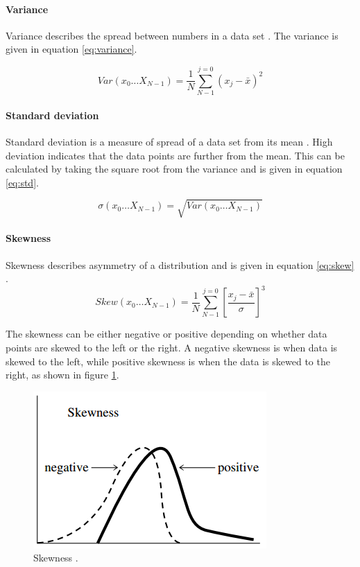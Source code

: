 \documentclass[USenglish]{ifimaster}  %
\begin{document}
	
\paragraph{Variance}
Variance describes the spread between numbers in a data set \cite{Press:2007:NRE:1403886}. The variance is given in equation \ref{eq:variance}.
	
\begin{equation}
Var(x_0\dotsc X_{N-1})  = \frac{1}{N}\sum_{N-1}^{j=0}(x_{j}-\bar{x})^2
\label{eq:variance}
\end{equation}

\paragraph{Standard deviation}
Standard deviation is a measure of spread of a data set from its mean \cite{Press:2007:NRE:1403886}. High deviation indicates that the data points are further from the mean. This can be calculated by taking the square root from the variance and is given in equation \ref{eq:std}.
	
	\begin{equation}
	\sigma(x_0\dotsc X_{N-1})  = \sqrt{Var(x_0\dotsc X_{N-1})}
	\label{eq:std}
	\end{equation}
	
\paragraph{Skewness} 
Skewness describes asymmetry of a distribution and is given in equation \ref{eq:skew} \cite{Press:2007:NRE:1403886}.
	\begin{equation}
	Skew(x_0\dotsc X_{N-1})  =  \frac{1}{N}\sum_{N-1}^{j=0}\left [ \frac{x_j-\bar{x}}{\sigma} \right ]^3
	\label{eq:skew}
	\end{equation}
	
The skewness can be either negative or positive depending on whether data points are skewed to the left or the right. A negative skewness is when data is skewed to the left, while positive skewness is when the data is skewed to the right, as shown in figure \ref{fig:skew}.
	
	\begin{figure}[h]
		\centering
		\includegraphics[scale=0.8]{Figures/Skewness}
		\caption[Skewness]{Skewness \cite{Press:2007:NRE:1403886}.}
		\label{fig:skew}
	\end{figure}
	
\end{document}
